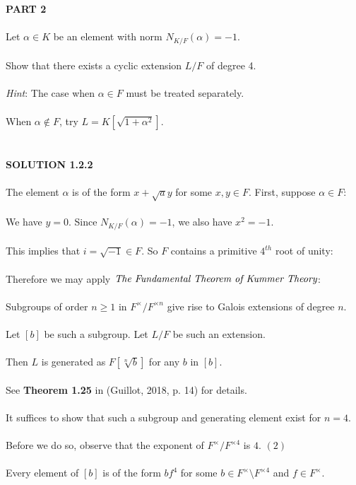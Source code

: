 \documentclass{article}
\begin{document}
\noindent \textbf{PART 2} \\\\
\indent Let $\alpha \in K$ be an element with norm $N_{K/F}(\alpha) = -1$. \\\\
\indent Show that there exists a cyclic extension $L/F$ of degree 4. \\\\
\indent \emph{Hint}: The case when $\alpha \in F$ must be treated separately. \\\\
\indent When $\alpha \notin F$, try $L = K[\sqrt{1+\alpha^2}]$. \\\\
\\
\textbf{SOLUTION 1.2.2} \\\\
\noindent The element $\alpha$ is of the form $x + \sqrt{a} y$ for some $x, y \in F$. First, suppose $\alpha \in F$: \\\\
We have $y = 0$. Since $N_{K/F}(\alpha) = -1$, we also have $x^2 = -1$. \\\\
This implies that $i = \sqrt{-1} \in F$. So $F$ contains a primitive $4^{th}$ root of unity: \\\\
Therefore we may apply $\emph{The Fundamental Theorem of Kummer Theory}$: \\\\ 
\indent Subgroups of order $n \geq 1$ in $F^\times/F^{\times n}$ give rise to Galois extensions of degree $n$. \\\\
\indent Let $[b]$ be such a subgroup. Let $L/F$ be such an extension. \\\\
\indent Then $L$ is generated as $F[\sqrt[n]{b}]$ for any $b$ in $[b]$. \\\\
\indent See \textbf{Theorem 1.25} in (Guillot, 2018, p. 14) for details. \\\\
It suffices to show that such a subgroup and generating element exist for $n = 4$. \\\\
Before we do so, observe that the exponent of $F^\times/F^{\times4}$ is $4$. \indent $(2)$ \\\\
\indent Every element of $[b]$ is of the form $bf^{4}$ for some $b \in F^\times{\setminus}F^{\times4}$ and $f \in F^\times$. \\\\
\end{document}
